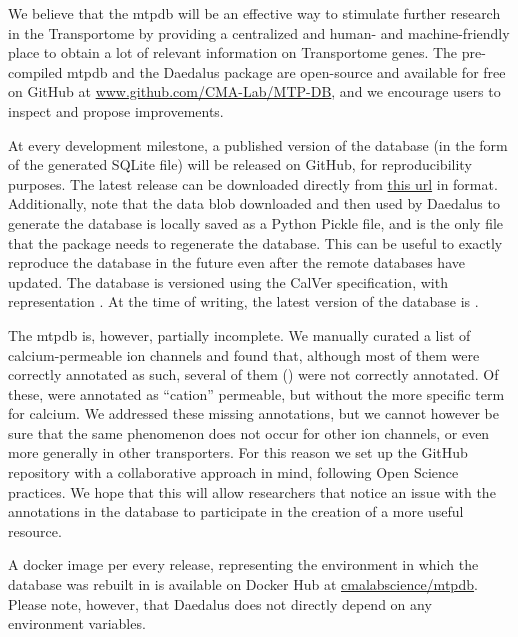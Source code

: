 We believe that the \gls{mtpdb} will be an effective way to stimulate further research in the Transportome by providing a centralized and human- and machine-friendly place to obtain a lot of relevant information on Transportome genes.
The pre-compiled \gls{mtpdb} and the Daedalus package are open-source and available for free on GitHub at \href{https://github.com/CMA-Lab/MTP-DB/}{www.github.com/CMA-Lab/MTP-DB}, and we encourage users to inspect and propose improvements.

At every development milestone, a published version of the database (in the form of the generated SQLite file) will be released on GitHub, for reproducibility purposes.
The latest release can be downloaded directly from \href{https://github.com/CMA-Lab/MTP-DB/releases/latest/download/MTPDB.sqlite.gz}{this url} in  format.
Additionally, note that the data blob downloaded and then used by Daedalus to generate the database is locally saved as a Python Pickle file, and is the only file that the package needs to regenerate the database.
This can be useful to exactly reproduce the database in the future even after the remote databases have updated.
The database is versioned using the CalVer specification, with representation .
At the time of writing, the latest version of the database is .

The \gls{mtpdb} is, however, partially incomplete.
We manually curated a list of  calcium-permeable ion channels and found that, although most of them were correctly annotated as such, several of them () were not correctly annotated.
Of these,  were annotated as ``cation'' permeable, but without the more specific term for calcium.
We addressed these missing annotations, but we cannot however be sure that the same phenomenon does not occur for other ion channels, or even more generally  in other transporters.
For this reason we set up the GitHub repository with a collaborative approach
in mind, following Open Science practices.
We hope that this will allow researchers that notice an issue with the annotations in the database to participate in the creation of a more useful resource.

A docker image per every release, representing the environment in which the database was rebuilt in is available on Docker Hub at \href{https://hub.docker.com/r/cmalabscience/mtpdb}{cmalabscience/mtpdb}.
Please note, however, that Daedalus does not directly depend on any environment variables.

